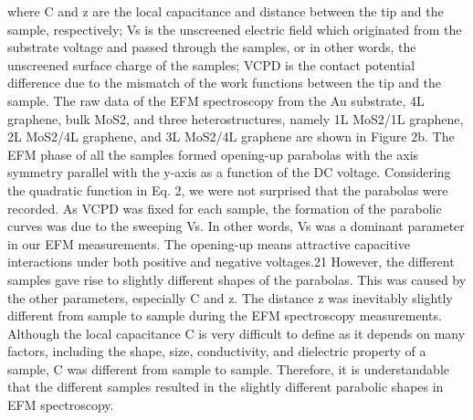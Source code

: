 where C and z are the local capacitance and distance between the tip and the sample, respectively; Vs is the unscreened electric field which originated from the substrate voltage and passed through the samples, or in other words, the unscreened surface charge of the samples; VCPD is the contact potential difference due to the mismatch of the work functions between the tip and the sample. The raw data of the EFM spectroscopy from the Au substrate, 4L graphene, bulk MoS2, and three heterostructures, namely 1L MoS2/1L graphene, 2L MoS2/4L graphene, and 3L MoS2/4L graphene are shown in Figure 2b. The EFM phase of all the samples formed opening-up parabolas with the axis symmetry parallel with the y-axis as a function of the DC voltage. Considering the quadratic function in Eq. 2, we were not surprised that the parabolas were recorded. As VCPD was fixed for each sample, the formation of the parabolic curves was due to the sweeping Vs. In other words, Vs was a dominant parameter in our EFM measurements. The opening-up means attractive capacitive interactions under both positive and negative voltages.21 However, the different samples gave rise to slightly different shapes of the parabolas. This was caused by the other parameters, especially C and z. The distance z was inevitably slightly different from sample to sample during the EFM spectroscopy measurements. Although the local capacitance C is very difficult to define as it depends on many factors, including the shape, size, conductivity, and dielectric property of a sample, C was different from sample to sample. Therefore, it is understandable that the different samples resulted in the slightly different parabolic shapes in EFM spectroscopy. 
